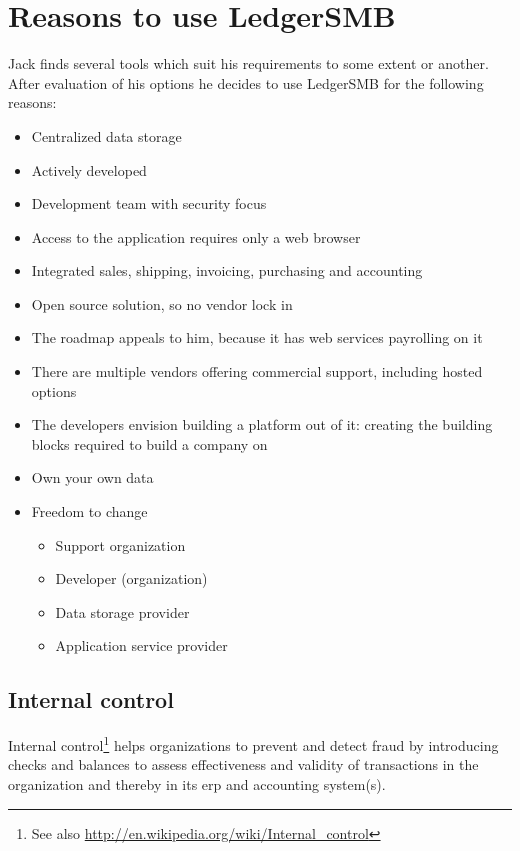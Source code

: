 \chapter{Reasons to use LedgerSMB}
\label{cha-advocacy}

Jack finds several tools which suit his requirements to some extent or another.
After evaluation of his options he decides to use LedgerSMB for the following reasons:

\begin{itemize}
\item Centralized data storage
\item Actively developed
\item Development team with security focus
\item Access to the application requires only a web browser
\item Integrated sales, shipping, invoicing, purchasing and accounting
\item Open source solution, so no vendor lock in
\item The roadmap appeals to him, because it has web services payrolling on it
\item There are multiple vendors offering commercial support, including hosted options
\item The developers envision building a platform out of it: creating the building blocks
required to build a company on
\end{itemize}


\begin{itemize}
\item Own your own data
\item Freedom to change
	\begin{itemize}
	\item Support organization
	\item Developer (organization)
	\item Data storage provider
	\item Application service provider
	\end{itemize}
\end{itemize}

\section{Internal control}
\label{sec-advocacy-internal-control}

Internal control\footnote{See also \url{http://en.wikipedia.org/wiki/Internal_control}}
helps organizations to prevent and detect fraud by introducing checks and balances
to assess effectiveness and validity of transactions in the organization and thereby
in its \gls{erp} and accounting system(s).

